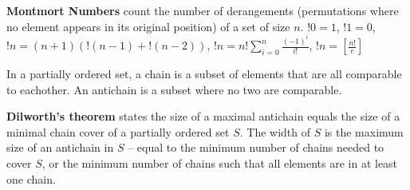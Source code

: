 \textbf{Montmort Numbers} count the number of derangements (permutations where no element appears in its original position) of a set of size $n$. $!0 = 1$, $!1 = 0$, $!n = (n+1)(!(n-1)+!(n-2))$, $!n = n!\sum_{i=0}^{n}\frac{(-1)^i}{i!}$, $!n = [\frac{n!}{e}]$

\hrulefill

In a partially ordered set, a chain is a subset of elements that are all comparable to eachother. An antichain is a subset where no two are comparable.

\vspace{1em}
\textbf{Dilworth's theorem} states the size of a maximal antichain equals the size of a minimal chain cover of a partially ordered set $S$. The width of $S$ is the maximum size of an antichain in $S$ -- equal to the minimum number of chains needed to cover $S$, or the minimum number of chains such that all elements are in at least one chain.